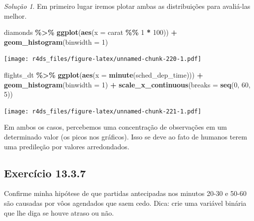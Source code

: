 \documentclass[
]{latex/krantz}
\newenvironment{Shaded}{\begin{snugshade}}{\end{snugshade}}
\newcommand{\AttributeTok}[1]{\textcolor[rgb]{0.13,0.29,0.53}{#1}}
\newcommand{\DecValTok}[1]{\textcolor[rgb]{0.00,0.00,0.81}{#1}}
\newcommand{\FunctionTok}[1]{\textcolor[rgb]{0.13,0.29,0.53}{\textbf{#1}}}
\newcommand{\NormalTok}[1]{#1}
\newcommand{\SpecialCharTok}[1]{\textcolor[rgb]{0.81,0.36,0.00}{\textbf{#1}}}
\theoremstyle{definition}
\theoremstyle{definition}
\theoremstyle{definition}
\theoremstyle{definition}
\theoremstyle{remark}
\newtheorem*{solution}{Solução}
\begin{document}
\begin{solution}
Em primeiro lugar iremos plotar ambas as distribuições para avaliá-las melhor.

\begin{Shaded}
\begin{Highlighting}[]
\NormalTok{diamonds }\SpecialCharTok{\%\textgreater{}\%}
  \FunctionTok{ggplot}\NormalTok{(}\FunctionTok{aes}\NormalTok{(}\AttributeTok{x =}\NormalTok{ carat }\SpecialCharTok{\%\%} \DecValTok{1} \SpecialCharTok{*} \DecValTok{100}\NormalTok{)) }\SpecialCharTok{+}
    \FunctionTok{geom\_histogram}\NormalTok{(}\AttributeTok{binwidth =} \DecValTok{1}\NormalTok{)}
\end{Highlighting}
\end{Shaded}

\texttt{[image: r4ds\_files/figure-latex/unnamed-chunk-220-1.pdf]}

\begin{Shaded}
\begin{Highlighting}[]
\NormalTok{flights\_dt }\SpecialCharTok{\%\textgreater{}\%}
  \FunctionTok{ggplot}\NormalTok{(}\FunctionTok{aes}\NormalTok{(}\AttributeTok{x =} \FunctionTok{minute}\NormalTok{(sched\_dep\_time))) }\SpecialCharTok{+}
    \FunctionTok{geom\_histogram}\NormalTok{(}\AttributeTok{binwidth =} \DecValTok{1}\NormalTok{) }\SpecialCharTok{+} 
    \FunctionTok{scale\_x\_continuous}\NormalTok{(}\AttributeTok{breaks =} \FunctionTok{seq}\NormalTok{(}\DecValTok{0}\NormalTok{, }\DecValTok{60}\NormalTok{, }\DecValTok{5}\NormalTok{))}
\end{Highlighting}
\end{Shaded}

\texttt{[image: r4ds\_files/figure-latex/unnamed-chunk-221-1.pdf]}

Em ambos os casos, percebemos uma concentração de observações em um determinado valor (os picos nos gráficos). Isso se deve ao fato de humanos terem uma predileção por valores arredondados.
\end{solution}

\hypertarget{exr13-3-7}{%
\subsection*{Exercício 13.3.7}\label{exr13-3-7}}

Confirme minha hipótese de que partidas antecipadas nos minutos 20-30 e 50-60 são causadas por vôos agendados que saem cedo. Dica: crie uma variável binária que lhe diga se houve atraso ou não.
\end{document}
